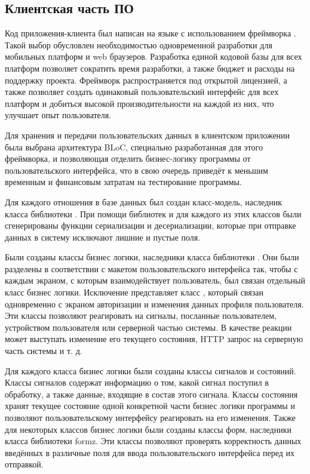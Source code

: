 \subsection{Клиентская часть ПО}

\tab
Код приложения-клиента был написан на языке  с использованием фреймворка \cite{flutter-vs-react}.
Такой выбор обусловлен необходимостью одновременной разработки для мобильных платформ и web браузеров.
Разработка единой кодовой базы для всех платформ позволяет сократить время разработки, а также бюджет и расходы на поддержку проекта.
Фреймворк  распространяется под открытой лицензией, а также позволяет создать одинаковый пользовательский интерфейс для всех платформ и добиться высокой производительности на каждой из них, что улучшает опыт пользователя\cite{flutter-better}.

\tab
Для хранения и передачи пользовательских данных в клиентском приложении была выбрана архитектура BLoC\cite{bloc-better}, специально разработанная для этого фреймворка, и позволяющая отделить бизнес-логику программы от пользовательского интерфейса, что в свою очередь приведёт к меньшим временным и финансовым затратам на тестирование программы.

\tab
Для каждого отношения в базе данных был создан класс-модель, наследник класса  библиотеки .
При помощи библиотек  и  для каждого из этих классов были сгенерированы функции сериализации и десериализации, которые при отправке данных в систему исключают лишние и пустые поля.

\tab
Были созданы классы бизнес логики, наследники класса  библиотеки .
Они были разделены в соответствии с макетом пользовательского интерфейса так, чтобы с каждым экраном, с которым взаимодействует пользователь, был связан отдельный класс бизнес логики.
Исключение представляет класс , который связан одновременно с экраном авторизации и изменения данных профиля пользователя.
Эти классы позволяют реагировать на сигналы, посланные пользователем, устройством пользователя или серверной частью системы.
В качестве реакции может выступать изменение его текущего состояния, HTTP запрос на серверную часть системы и т. д.

\tab
Для каждого класса бизнес логики были созданы классы сигналов и состояний.
Классы сигналов содержат информацию о том, какой сигнал поступил в обработку, а также данные, входящие в состав этого сигнала.
Классы состояния хранят текущее состояние одной конкретной части бизнес логики программы и позволяют пользовательскому интерфейсу реагировать на его изменения.
Также для некоторых классов бизнес логики были созданы классы форм, наследники класса  библиотеки formz.
Эти классы позволяют проверять корректность данных введённых в различные поля для ввода пользовательского интерфейса перед их отправкой.

